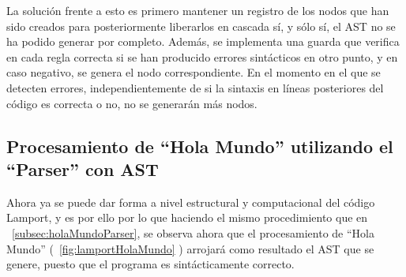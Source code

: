\vspace{0.5cm}
La solución frente a esto es primero mantener un registro de los nodos que han sido creados para posteriormente liberarlos en cascada sí, y sólo sí, el AST no se ha podido generar por completo. Además, se implementa una guarda que verifica en cada regla correcta si se han producido errores sintácticos en otro punto, y en caso negativo, se genera el nodo correspondiente. En el momento en el que se detecten errores, independientemente de si la sintaxis en líneas posteriores del código es correcta o no, no se generarán más nodos.

\subsection{Procesamiento de ``Hola Mundo'' utilizando el ``Parser'' con AST}
Ahora ya se puede dar forma a nivel estructural y computacional del código Lamport, y es por ello por lo que haciendo el mismo procedimiento que en ~\ref{subsec:holaMundoParser}, se observa ahora que el procesamiento de ``Hola Mundo'' (~\ref{fig:lamportHolaMundo} ) arrojará como resultado el AST que se genere, puesto que el programa es sintácticamente correcto.

